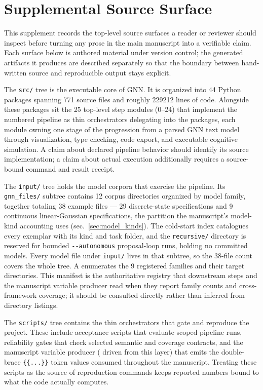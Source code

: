 \documentclass[
  english,
  9pt,
]{extarticle}
\begin{document}
\newpage

\section{Supplemental Source Surface}\label{sec:source_surface}

This supplement records the top-level source surfaces a reader or
reviewer should inspect before turning any prose in the main manuscript
into a verifiable claim. Each surface below is authored material under
version control; the generated artifacts it produces are described
separately so that the boundary between hand-written source and
reproducible output stays explicit.

The \texttt{src/} tree is the executable core of GNN. It is organized
into 44 Python packages spanning 771 source files and roughly 229212
lines of code. Alongside these packages sit the 25 top-level step
modules (0--24) that implement the numbered pipeline as thin
orchestrators delegating into the packages, each module owning one stage
of the progression from a parsed GNN text model through visualization,
type checking, code export, and executable cognitive simulation. A claim
about declared pipeline behavior should identify its source
implementation; a claim about actual execution additionally requires a
source-bound command and result receipt.

The \texttt{input/} tree holds the model corpora that exercise the
pipeline. Its \texttt{gnn\_files/} subtree contains 12 corpus
directories organized by model family, together totaling 38 example
files --- 29 discrete-state specifications and 9 continuous
linear-Gaussian specifications, the partition the manuscript's
model-kind accounting uses (sec.~\ref{sec:model_kinds}). The cold-start
index  catalogues every exemplar with
its kind and task folder, and the \texttt{recursive/} directory is
reserved for bounded \texttt{-\/-autonomous} proposal-loop runs, holding
no committed models. Every model file under \texttt{input/} lives in
that subtree, so the 38-file count covers the whole tree. A
 enumerates the 9 registered
families and their target directories. This manifest is the
authoritative registry that downstream steps and the manuscript variable
producer read when they report family counts and cross-framework
coverage; it should be consulted directly rather than inferred from
directory listings.

The \texttt{scripts/} tree contains the thin orchestrators that gate and
reproduce the project. These include acceptance scripts that evaluate
scoped pipeline runs, reliability gates that check selected semantic and
coverage contracts, and the manuscript variable producer
( driven from this layer) that
emits the double-brace \texttt{\{\{...\}\}} token values consumed
throughout the manuscript. Treating these scripts as the source of
reproduction commands keeps reported numbers bound to what the code
actually computes.
\end{document}
